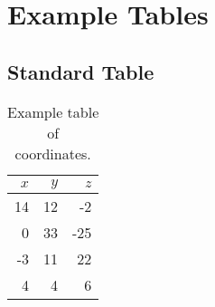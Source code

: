
\chapter{Example Tables}


\section{Standard Table}
\label{sec:table_examples}
\begin{table}[H] %
  \centering
  \begin{tabular}{|rr|r|}
    \hline
    $x$ & $y$ & $z$ \\
    \hline
    14 & 12 & -2 \\
    0 & 33 & -25 \\
    -3 & 11 & 22 \\
    4 & 4 & 6 \\
    \hline
  \end{tabular}
  \caption{Example table of coordinates.}
  \label{tab:coordinates}
\end{table}

